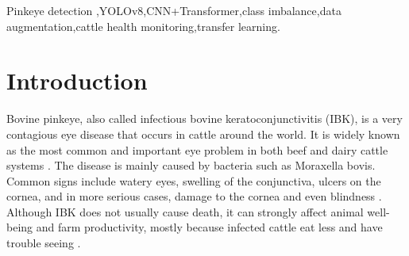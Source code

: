 \documentclass[preprint,12pt,authoryear]{elsarticle}
\begin{document}
\begin{frontmatter}
\begin{abstract}
Infectious bovine keratoconjunctivitis (IBK), commonly known as pinkeye, is a highly contagious ocular disease in cattle that causes significant welfare and economic losses. Early automated detection from farm images can enable timely veterinary intervention. We present a two-stage deep learning pipeline: \emph{Stage~1} localizes the eye region using a YOLOv8 detector, and \emph{Stage~2} classifies the cropped eye as healthy or diseased using four architectures: ResNet18, EfficientNet-B0, a baseline CNN+Transformer hybrid, and an enhanced CNN+Transformer variant with a class token and deeper head. Evaluated on 394 labeled eye crops (309 healthy, 85 pinkeye) under stratified 5-fold cross-validation, the Strong CNN+Transformer achieves the highest mean accuracy (95.94\,\%) and the highest mean F1-score on the minority pinkeye class (90.51\,\%); ResNet18 attains the highest mean ROC-AUC (98.67\,\%) among the four models in the primary benchmark. Augmentation ablations show architecture-dependent gains and trade-offs. These results support eye-localized classification as a feasible screen for this imbalanced, fine-grained imaging setting.
\end{abstract}



\begin{keyword}
Pinkeye detection \sep YOLOv8\sep CNN+Transformer\sep class imbalance\sep data augmentation\sep cattle health monitoring\sep transfer learning.

\end{keyword}

\end{frontmatter}


\section{Introduction}
\label{intro}

Bovine pinkeye, also called infectious bovine keratoconjunctivitis (IBK), is a very contagious eye disease that occurs in cattle around the world. It is widely known as the most common and important eye problem in both beef and dairy cattle systems \citep{brown1998}. The disease is mainly caused by bacteria such as Moraxella bovis. Common signs include watery eyes, swelling of the conjunctiva, ulcers on the cornea, and in more serious cases, damage to the cornea and even blindness \citep{kizilkaya2013}. Although IBK does not usually cause death, it can strongly affect animal well-being and farm productivity, mostly because infected cattle eat less and have trouble seeing \citep{kizilkaya2013}.
\end{document}
